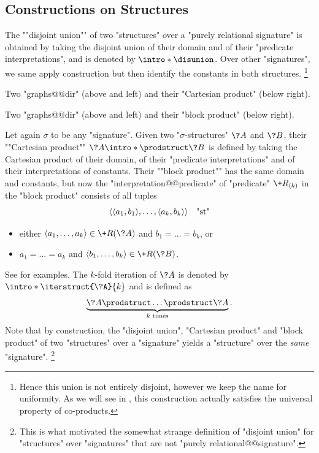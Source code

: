 \subsection{Constructions on Structures}

The \AP""disjoint union"" of two "structures" over a
"purely relational signature" 
is obtained by taking the disjoint union of their domain and of
their "predicate interpretations", and is denoted by \AP$\intro*\disunion$.
Over other "signatures", we same apply construction but then identify the constants
in both structures.%
\footnote{Hence this union is not entirely disjoint, however we keep the name
for uniformity. As we will see in , this construction
actually satisfies the universal property of co-products.}

\begin{marginfigure}
	\centering
	\begin{tikzpicture}
		
	\end{tikzpicture}
	\caption{
		\AP\label{fig:general-prelim-product-Cartesian}
		Two "graphs@@dir" (above and left) and their "Cartesian product" (below right).
	}
\end{marginfigure}
\begin{marginfigure}
	\centering
	\begin{tikzpicture}
		
	\end{tikzpicture}
	\caption{
		\AP\label{fig:general-prelim-product-block}
		Two "graphs@@dir" (above and left) and their "block product" (below right).
	}
\end{marginfigure}
Let again $\sigma$ to be any "signature".
Given two "$\sigma$-structures" $\?A$ and $\?B$, their
""Cartesian product"" \AP$\?A \intro*\prodstruct \?B$
is defined by taking the Cartesian product of their domain, of
their "predicate interpretations" and of their interpretations of constants. 
Their ""block product"" has the same domain and constants,
but now the "interpretation@@predicate" of "predicate" $\+R_{(k)}$
in the "block product" consists of all tuples
\[\tup{\tup{a_1,b_1}, \dotsc, \tup{a_k,b_k}} \quad\text{"st"}\] 
\begin{itemize}
	\item either $\tup{a_1, \dotsc, a_k} \in \+R(\?A)$ and $b_1 = \dotsc = b_k$, or
	\item $a_1 = \dotsc = a_k$ and $\tup{b_1, \dotsc, b_k} \in \+R(\?B)$.
\end{itemize} 
See  for examples.
The $k$-fold iteration of $\?A$ is denoted by
$\intro*\iterstruct{\?A}{k}$ and is defined as
\[
	\underbrace{\?A \prodstruct \dotsc \prodstruct \?A}_{k \text{ times}}.
\]
Note that by construction, the "disjoint union", "Cartesian product" and "block product"
of two "structures" over a "signature" yields a "structure" over the \emph{same} "signature".%
\footnote{This is what motivated the somewhat strange definition
of "disjoint union" for "structures" over "signatures" that are not "purely relational@@signature".}

